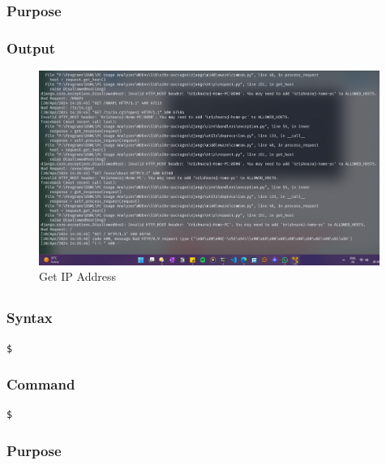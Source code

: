 \documentclass[11pt]{article}
\begin{document}
\subsubsection*{Purpose}

\subsubsection*{Output}
\begin{figure}[H]
    \centering
    \includegraphics[width=0.99\textwidth]{a3_ss (11).png}
    \caption{Get IP Address}
    \label{fig:1}
\end{figure}
\subsection{}

\subsubsection*{Syntax}
\begin{verbatim}
$
\end{verbatim}

\subsubsection*{Command}
\begin{verbatim}
$
\end{verbatim}

\subsubsection*{Purpose}
\end{document}
